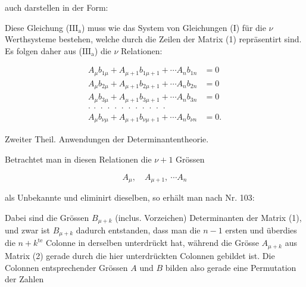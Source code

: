 auch darstellen in der Form:


Diese Gleichung ($\mathrm{III_a}$) muss wie das System von Gleichungen (I) f\"ur die $\nu$ Werthsysteme bestehen, welche durch die Zeilen der Matrix (1) repr\"asentirt sind. Es folgen daher aus ($\mathrm{III_a}$) die $\nu$ Relationen:

\[
\begin{aligned}
A_\mu b_{1\mu} + A_{\mu+1} b_{1\mu+1} + \cdots A_n b_{1n} &= 0 \\
A_\mu b_{2\mu} + A_{\mu+1} b_{2\mu+1} + \cdots A_n b_{2n} &= 0 \\
A_\mu b_{3\mu} + A_{\mu+1} b_{3\mu+1} + \cdots A_n b_{3n} &= 0 \\
\cdot\ \cdot\ \cdot\ \cdot\ \cdot\ \cdot\ \cdot\ \cdot\ \cdot\ \cdot\ \cdot\ \cdot \\
A_\mu b_{\nu\mu} + A_{\mu+1} b_{\nu\mu+1} + \cdots A_n b_{\nu n} &= 0.
\end{aligned}
\]


 \quad Zweiter Theil. Anwendungen der Determinantentheorie.

Betrachtet man in diesen Relationen die $\nu+1$ Gr\"ossen

\[
A_\mu,\quad A_{\mu+1},\ \cdots A_n
\]

als Unbekannte und eliminirt dieselben, so erh\"alt man nach Nr. 103:


Dabei sind die Gr\"ossen $B_{\mu+k}$ (inclus. Vorzeichen) Determinanten der Matrix (1), und zwar ist $B_{\mu+k}$ dadurch entstanden, dass man die $n-1$ ersten und \"uberdies die $n+k^{\text{te}}$ Colonne in derselben unterdr\"uckt hat, w\"ahrend die Gr\"osse $A_{\mu+k}$ aus Matrix (2) gerade durch die hier unterdr\"uckten Colonnen gebildet ist. Die Colonnen entsprechender Gr\"ossen $A$ und $B$ bilden also gerade eine Permutation der Zahlen

